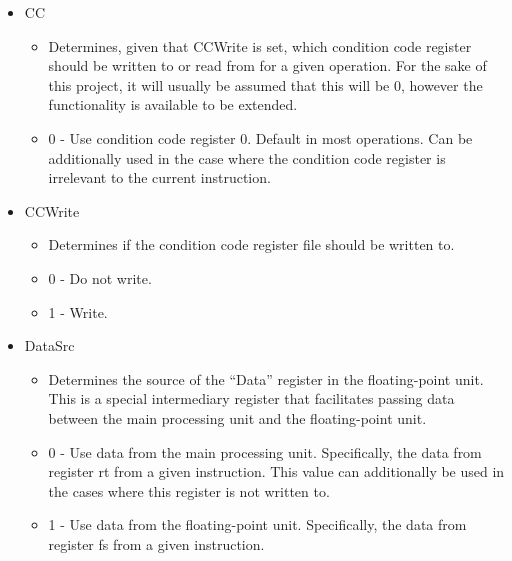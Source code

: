 \documentclass[
    paper=letter,
    parskip=half,
    fontsize=12pt,
    titlepage=firstiscover,
    toc=bibliography,
    numbers=endperiod
]{scrartcl}
\providecommand{\tightlist}{%
  \setlength{\itemsep}{0pt}\setlength{\parskip}{0pt}}
\begin{document}
\begin{itemize}
    \item CC
          \begin{itemize}
              \tightlist
              \item Determines, given that CCWrite is set, which condition code register
                    should be written to or read from for a given operation. For the sake of
                    this project, it will usually be assumed that this will be 0, however
                    the functionality is available to be extended.
              \item 0 - Use condition code register 0. Default in most operations. Can
                    be additionally used in the case where the condition code register
                    is irrelevant to the current instruction.
          \end{itemize}

    \item CCWrite
          \begin{itemize}
              \tightlist
              \item Determines if the condition code register file should be written to.
              \item 0 - Do not write.
              \item 1 - Write.
          \end{itemize}

    \item DataSrc
          \begin{itemize}
              \tightlist
              \item Determines the source of the ``Data'' register in the floating-point
                    unit. This is a special intermediary register that facilitates passing
                    data between the main processing unit and the floating-point unit.
              \item 0 - Use data from the main processing unit. Specifically, the data
                    from register rt from a given instruction. This value can
                    additionally be used in the cases where this register is not written
                    to.
              \item 1 - Use data from the floating-point unit. Specifically, the data
                    from register fs from a given instruction.
          \end{itemize}


\end{itemize}
\end{document}
